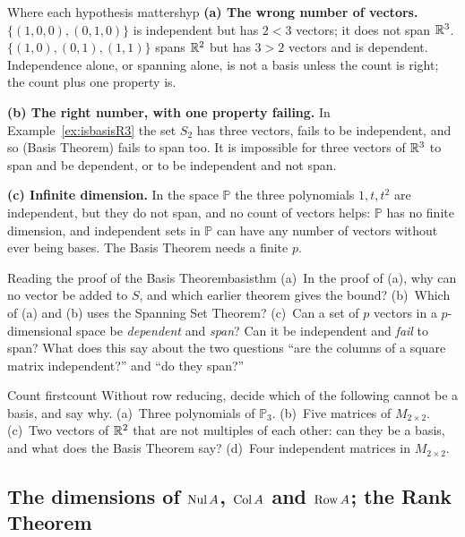 \documentclass[11pt]{article}
\begin{document}
\begin{exmp}{Where each hypothesis matters}{hyp}
\textbf{(a) The wrong number of vectors.} $\{(1,0,0),(0,1,0)\}$ is independent but has $2<3$ vectors; it does not span $\mathbb{R}^3$. $\{(1,0),(0,1),(1,1)\}$ spans $\mathbb{R}^2$ but has $3>2$ vectors and is dependent. Independence alone, or spanning alone, is not a basis unless the count is right; the count plus one property is.

\textbf{(b) The right number, with one property failing.} In Example~\ref{ex:isbasisR3} the set $S_2$ has three vectors, fails to be independent, and so (Basis Theorem) fails to span too. It is impossible for three vectors of $\mathbb{R}^3$ to span and be dependent, or to be independent and not span.

\textbf{(c) Infinite dimension.} In the space $\mathbb{P}$ the three polynomials $1,t,t^2$ are independent, but they do not span, and no count of vectors helps: $\mathbb{P}$ has no finite dimension, and independent sets in $\mathbb{P}$ can have any number of vectors without ever being bases. The Basis Theorem needs a finite $p$.
\end{exmp}

\begin{think}{Reading the proof of the Basis Theorem}{basisthm}
(a)~In the proof of (a), why can no vector be added to $S$, and which earlier theorem gives the bound? (b)~Which of (a) and (b) uses the Spanning Set Theorem? (c)~Can a set of $p$ vectors in a $p$-dimensional space be \emph{dependent} and \emph{span}? Can it be independent and \emph{fail} to span? What does this say about the two questions ``are the columns of a square matrix independent?'' and ``do they span?''
\end{think}

\begin{kc}{Count first}{count}
Without row reducing, decide which of the following cannot be a basis, and say why. (a)~Three polynomials of $\mathbb{P}_3$. (b)~Five matrices of $M_{2\times2}$. (c)~Two vectors of $\mathbb{R}^2$ that are not multiples of each other: can they be a basis, and what does the Basis Theorem say? (d)~Four independent matrices in $M_{2\times2}$.
\end{kc}

\subsection*{The dimensions of $\operatorname{Nul} A$, $\operatorname{Col} A$ and $\operatorname{Row} A$; the Rank Theorem}
\end{document}
